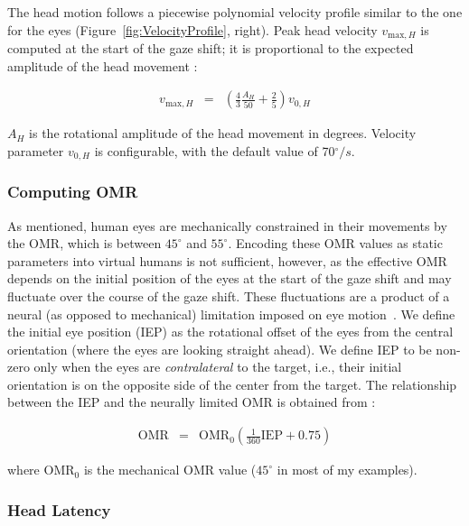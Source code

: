 The head motion follows a piecewise polynomial velocity profile similar to the one for the eyes (Figure~\ref{fig:VelocityProfile}, right). Peak head velocity $v_{\mathrm{max},H}$ is computed at the start of the gaze shift; it is proportional to the expected amplitude of the head movement \cite{guitton1987gaze}:

\begin{align} \label{eq:AndristVmaxH}
v_{\mathrm{max},H} &=& (\frac{4}{3} \frac{A_H}{50} + \frac{2}{5}) v_{0,H}
\end{align}

$A_H$ is the rotational amplitude of the head movement in degrees. Velocity parameter $v_{0,H}$ is configurable, with the default value of 70$^{\circ}/s$.

\subsubsection{Computing OMR}

As mentioned, human eyes are mechanically constrained in their movements by the OMR, which is between $45^{\circ}$ and $55^{\circ}$. Encoding these OMR values as static parameters into virtual humans is not sufficient, however, as the effective OMR depends on the initial position of the eyes at the start of the gaze shift and may fluctuate over the course of the gaze shift. These fluctuations are a product of a neural (as opposed to mechanical) limitation imposed on eye motion~\cite{guitton1987gaze}. We define the initial eye position (IEP) as the rotational offset of the eyes from the central orientation (where the eyes are looking straight ahead). We define IEP to be non-zero only when the eyes are \emph{contralateral} to the target, i.e., their initial orientation is on the opposite side of the center from the target. The relationship between the IEP and the neurally limited OMR is obtained from \citet{guitton1987gaze}:

\begin{align} \label{eq:AndristOMRIEP}
\mathrm{OMR} &=& \mathrm{OMR}_0 (\frac{1}{360} \mathrm{IEP} + 0.75)
\end{align}

where $\mathrm{OMR}_0$ is the mechanical OMR value ($45^{\circ}$ in most of my examples).

\subsubsection{Head Latency}

